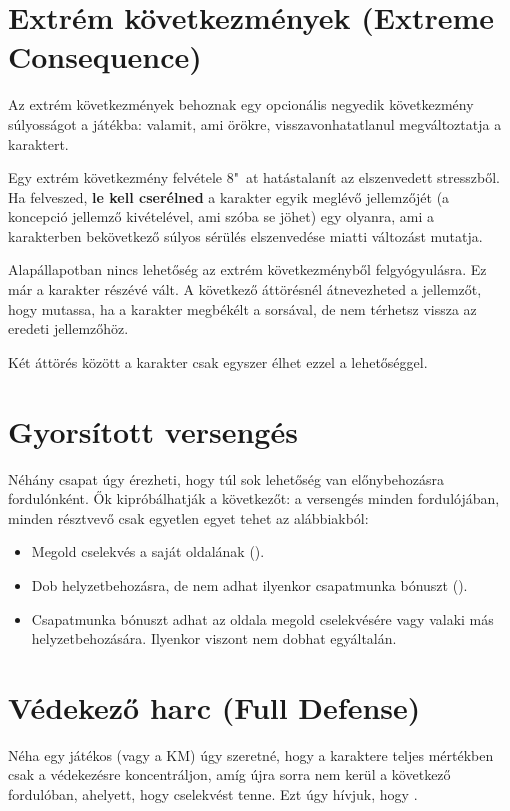 \section[Extrém következmények]{Extrém következmények (Extreme Consequence)}

Az extrém következmények behoznak egy opcionális negyedik következmény súlyosságot a játékba: valamit, ami örökre, visszavonhatatlanul megváltoztatja a karaktert.

Egy extrém következmény felvétele 8"~at hatástalanít az elszenvedett stresszből. Ha felveszed, \textbf{le kell cserélned} a karakter egyik meglévő jellemzőjét (a koncepció jellemző kivételével, ami szóba se jöhet) egy olyanra, ami a karakterben bekövetkező súlyos sérülés elszenvedése miatti változást mutatja.

Alapállapotban nincs lehetőség az extrém következményből felgyógyulásra. Ez már a karakter részévé vált. A következő áttörésnél átnevezheted a jellemzőt, hogy mutassa, ha a karakter megbékélt a sorsával, de nem térhetsz vissza az eredeti jellemzőhöz.

Két áttörés között a karakter csak egyszer élhet ezzel a lehetőséggel.

\section{Gyorsított versengés}

Néhány csapat úgy érezheti, hogy túl sok lehetőség van előnybehozásra fordulónként. Ők kipróbálhatják a következőt: a versengés minden fordulójában, minden résztvevő csak egyetlen egyet tehet az alábbiakból:

\begin{itemize}
    \item Megold cselekvés a saját oldalának ().
    \item Dob helyzetbehozásra, de nem adhat ilyenkor csapatmunka bónuszt ().
    \item Csapatmunka bónuszt adhat az oldala megold cselekvésére vagy valaki más helyzetbehozására. Ilyenkor viszont nem dobhat egyáltalán.
\end{itemize}

\label{Védekező harc}
\section[Védekező harc]{Védekező harc (Full Defense)}

Néha egy játékos (vagy a KM) úgy szeretné, hogy a karaktere teljes mértékben csak a védekezésre koncentráljon, amíg újra sorra nem kerül a következő fordulóban, ahelyett, hogy cselekvést tenne. Ezt úgy hívjuk, hogy .

